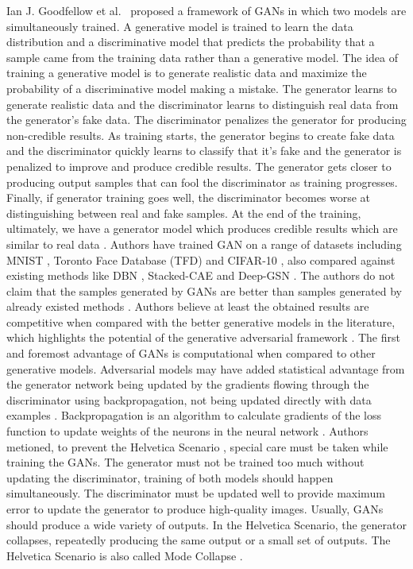 Ian J. Goodfellow et al.\ \cite{goodfellow2014generative} proposed a framework of \acp{GAN} in which two models are simultaneously trained. A generative model is trained to learn the data distribution and a discriminative model that predicts the probability that a sample came from the training data rather than a generative model. The idea of training a generative model is to generate realistic data and maximize the probability of a discriminative model making a mistake. The generator learns to generate realistic data and the discriminator learns to distinguish real data from the generator's fake data. The discriminator penalizes the generator for producing non-credible results. As training starts, the generator begins to create fake data and the discriminator quickly learns to classify that it's fake and the generator is penalized to improve and produce credible results. The generator gets closer to producing output samples that can fool the discriminator as training progresses. Finally, if generator training goes well, the discriminator becomes worse at distinguishing between real and fake samples.  At the end of the training, ultimately, we have a generator model which produces credible results which are similar to real data \cite{goodfellow2014generative}. Authors have trained \ac{GAN} on a range of datasets including MNIST \cite{726791}, Toronto Face Database (TFD) \cite{susskind2010toronto} and CIFAR-10 \cite{krizhevsky2009learning}, also compared against existing methods like \ac{DBN} \cite{bengio2012better}, \ac{Stacked-CAE} \cite{bengio2012better} and \ac{Deep-GSN} \cite{bengio2014deep}. The authors do not claim that the samples generated by \acp{GAN} are better than samples generated by already existed methods \cite{goodfellow2014generative}. Authors believe at least the obtained results are competitive when compared with the better generative models in the literature, which highlights the potential of the generative adversarial framework \cite{goodfellow2014generative}. The first and foremost advantage of \acp{GAN} is computational when compared to other generative models. Adversarial models may have added statistical advantage from the generator network being updated by the gradients flowing through the discriminator using backpropagation, not being updated directly with data examples \cite{goodfellow2014generative}. Backpropagation is an algorithm to calculate gradients of the loss function to update weights of the neurons in the neural network \cite{goodfellow2017deep}. Authors metioned, to prevent the Helvetica Scenario \cite{manisha2019generative}, special care must be taken while training the \acp{GAN}. The generator must not be trained too much without updating the discriminator, training of both models should happen simultaneously. The discriminator must be updated well to provide maximum error to update the generator to produce high-quality images. Usually, \acp{GAN} should produce a wide variety of outputs. In the Helvetica Scenario, the generator collapses, repeatedly producing the same output or a small set of outputs. The Helvetica Scenario is also called Mode Collapse \cite{thanhtung2020catastrophic}.

